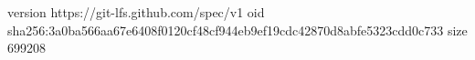 version https://git-lfs.github.com/spec/v1
oid sha256:3a0ba566aa67e6408f0120cf48cf944eb9ef19cdc42870d8abfe5323cdd0c733
size 699208
